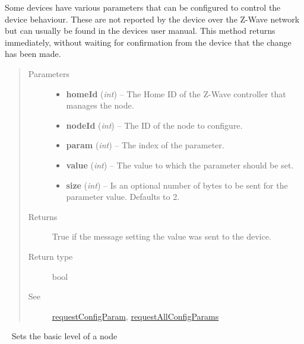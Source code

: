 \documentclass[letterpaper,10pt,english]{sphinxmanual}
\begin{document}
\begin{fulllineitems}
\begin{fulllineitems}
Some devices have various parameters that can be configured to control the
device behaviour.  These are not reported by the device over the Z-Wave network
but can usually be found in the devices user manual.  This method returns
immediately, without waiting for confirmation from the device that the change
has been made.
\begin{quote}\begin{description}
\item[{Parameters}] \leavevmode\begin{itemize}
\item {} 
\textbf{homeId} (\emph{int}) -- The Home ID of the Z-Wave controller that manages the node.

\item {} 
\textbf{nodeId} (\emph{int}) -- The ID of the node to configure.

\item {} 
\textbf{param} (\emph{int}) -- The index of the parameter.

\item {} 
\textbf{value} (\emph{int}) -- The value to which the parameter should be set.

\item {} 
\textbf{size} (\emph{int}) -- Is an optional number of bytes to be sent for the parameter value. Defaults to 2.

\end{itemize}

\item[{Returns}] \leavevmode
True if the message setting the value was sent to the device.

\item[{Return type}] \leavevmode
bool

\item[{See}] \leavevmode
{\hyperref[libopenzwave:requestconfigparam]{requestConfigParam}}, {\hyperref[libopenzwave:requestallconfigparams]{requestAllConfigParams}}

\end{description}\end{quote}

\end{fulllineitems}


\begin{fulllineitems}
\label{libopenzwave:libopenzwave.PyManager.setNodeLevel}~\label{libopenzwave:setnodelevel}
Sets the basic level of a node


\end{fulllineitems}
\end{fulllineitems}
\end{document}
